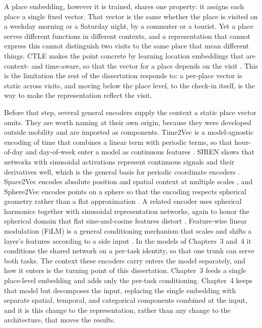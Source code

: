 A place embedding, however it is trained, shares one property: it assigns each place a
single fixed vector. That vector is the same whether the place is visited on a weekday
morning or a Saturday night, by a commuter or a tourist. Yet a place serves different
functions in different contexts, and a representation that cannot express this cannot
distinguish two visits to the same place that mean different things. CTLE makes the
point concrete by learning location embeddings that are context- and time-aware, so
that the vector for a place depends on the visit \cite{lin2021ctle}. This is the
limitation the rest of the dissertation responds to: a per-place vector is static
across visits, and moving below the place level, to the check-in itself, is the way
to make the representation reflect the visit.

Before that step, several general encoders supply the context a static place vector
omits. They are worth naming at their own origin, because they were developed outside
mobility and are imported as components. Time2Vec is a model-agnostic encoding of
time that combines a linear term with periodic terms, so that hour-of-day and
day-of-week enter a model as continuous features \cite{kazemi2019time2vec}. SIREN
shows that networks with sinusoidal activations represent continuous signals and their
derivatives well, which is the general basis for periodic coordinate encoders
\cite{sitzmann2020implicit}. Space2Vec encodes absolute position and spatial context
at multiple scales \cite{mai2020multiscalerepresentationlearningspatial}, and
Sphere2Vec encodes points on a sphere so that the encoding respects spherical
geometry rather than a flat approximation
\cite{mai2023sphere2vecgeneralpurposelocationrepresentation}. A related encoder uses
spherical harmonics together with sinusoidal representation networks, again to honor
the spherical domain that flat sine-and-cosine features distort
\cite{rußwurm2024geographiclocationencodingspherical}. Feature-wise linear modulation
(FiLM) is a general conditioning mechanism that scales and shifts a layer's features
according to a side input \cite{perez2018film}. In the models of Chapters~3 and~4 it
conditions the shared network on a per-task identity, so that one trunk can serve both
tasks. The context these encoders carry enters the model separately, and how it enters
is the turning point of this dissertation. Chapter~3 feeds a single place-level
embedding and adds only the per-task conditioning. Chapter~4 keeps that model but
decomposes the input, replacing the single embedding with separate spatial, temporal,
and categorical components combined at the input, and it is this change to the
representation, rather than any change to the architecture, that moves the results.

